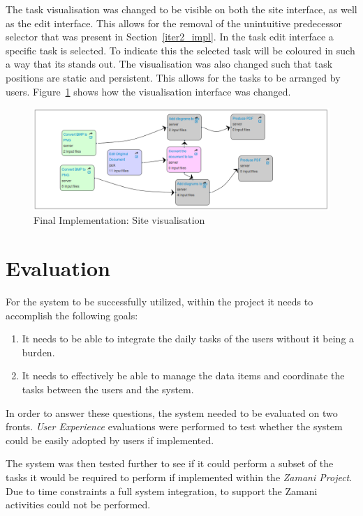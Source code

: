 \documentclass[12pt,a4paper]{report}
\begin{document}
The task visualisation was changed to be visible on both the site interface, as well as the 
edit interface. This allows for the removal of the unintuitive predecessor selector that
was present in Section~\ref{iter2_impl}. In the task edit interface a
specific task is selected. To indicate this the selected task will be 
coloured in such a way that its stands out. The visualisation was also
changed such that task positions are static and persistent. This allows
for the tasks to be arranged by users. Figure~\ref{final:visual} shows
how the visualisation interface was changed.


\begin{figure}[!h]
    \begin{center}
        \includegraphics[scale=0.45]{figures/final-visual.png}
    \end{center}
    \caption{Final Implementation: Site visualisation}
    \label{final:visual}
\end{figure}

\chapter{Evaluation}

For the system to be successfully utilized, within the project
it needs to accomplish the following goals: 
\begin{enumerate}
\item It needs to be able to integrate the daily tasks of the users
      without it being a burden. 
\item It needs to effectively be able to manage the data items and
      coordinate the tasks between the users and the system. 
\end{enumerate}

In order to answer these questions, the system needed to be evaluated on two
fronts. \emph{User Experience} evaluations were performed to test whether the
system could be easily adopted by users if implemented.

The system was then tested further to see if it could perform
a subset of the tasks it would be required to perform if implemented within
the \emph{Zamani Project}. Due to time constraints a full 
system integration, to support the Zamani activities could not be performed.
\end{document}
